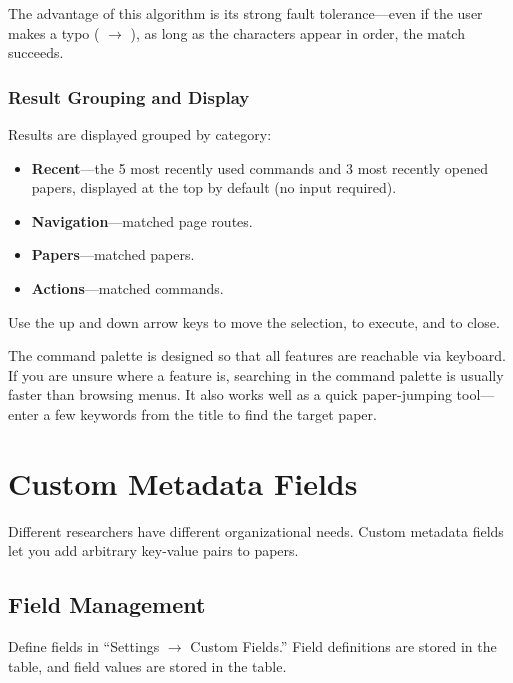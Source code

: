 The advantage of this algorithm is its strong fault tolerance---even if the user makes
a typo ( $\rightarrow$ ), as long as the characters appear
in order, the match succeeds.

\subsection{Result Grouping and Display}

Results are displayed grouped by category:

\begin{itemize}
  \item \textbf{Recent}---the 5 most recently used commands and 3 most recently opened
    papers, displayed at the top by default (no input required).
  \item \textbf{Navigation}---matched page routes.
  \item \textbf{Papers}---matched papers.
  \item \textbf{Actions}---matched commands.
\end{itemize}

Use the up and down arrow keys to move the selection,  to execute, and
 to close.

\begin{tipbox}
The command palette is designed so that all features are reachable via keyboard. If you
are unsure where a feature is, searching in the command palette is usually faster than
browsing menus. It also works well as a quick paper-jumping tool---enter a few keywords
from the title to find the target paper.
\end{tipbox}

\chapter{Custom Metadata Fields}
\label{ch:custom-fields}

Different researchers have different organizational needs. Custom metadata fields let
you add arbitrary key-value pairs to papers.

\section{Field Management}

Define fields in ``Settings $\rightarrow$ Custom Fields.'' Field definitions are stored
in the  table, and field values are stored in the
 table.

